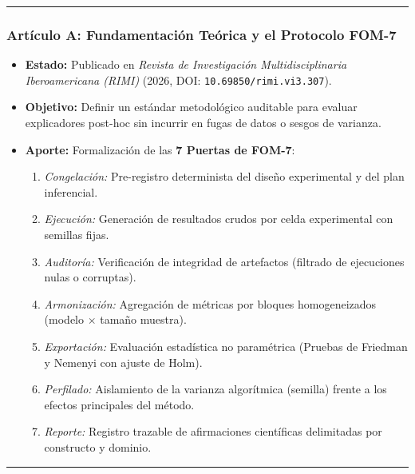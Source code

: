 \documentclass[
]{article}
\providecommand{\tightlist}{%
  \setlength{\itemsep}{0pt}\setlength{\parskip}{0pt}}
\begin{document}
\begin{center}\rule{0.5\linewidth}{0.5pt}\end{center}

\subsubsection{Artículo A: Fundamentación Teórica y el Protocolo
FOM-7}\label{artuxedculo-a-fundamentaciuxf3n-teuxf3rica-y-el-protocolo-fom-7}

\begin{itemize}
\tightlist
\item
  \textbf{Estado:} Publicado en \emph{Revista de Investigación
  Multidisciplinaria Iberoamericana (RIMI)} (2026, DOI:
  \texttt{10.69850/rimi.vi3.307}).
\item
  \textbf{Objetivo:} Definir un estándar metodológico auditable para
  evaluar explicadores post-hoc sin incurrir en fugas de datos o sesgos
  de varianza.
\item
  \textbf{Aporte:} Formalización de las \textbf{7 Puertas de FOM-7}:

  \begin{enumerate}
  \def\labelenumi{\arabic{enumi}.}
  \tightlist
  \item
    \emph{Congelación:} Pre-registro determinista del diseño
    experimental y del plan inferencial.
  \item
    \emph{Ejecución:} Generación de resultados crudos por celda
    experimental con semillas fijas.
  \item
    \emph{Auditoría:} Verificación de integridad de artefactos (filtrado
    de ejecuciones nulas o corruptas).
  \item
    \emph{Armonización:} Agregación de métricas por bloques
    homogeneizados (modelo \(\times\) tamaño muestra).
  \item
    \emph{Exportación:} Evaluación estadística no paramétrica (Pruebas
    de Friedman y Nemenyi con ajuste de Holm).
  \item
    \emph{Perfilado:} Aislamiento de la varianza algorítmica (semilla)
    frente a los efectos principales del método.
  \item
    \emph{Reporte:} Registro trazable de afirmaciones científicas
    delimitadas por constructo y dominio.
  \end{enumerate}
\end{itemize}

\begin{center}\rule{0.5\linewidth}{0.5pt}\end{center}
\end{document}
